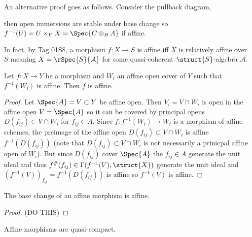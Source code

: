 \documentclass[12pt]{article}
\begin{document}
\begin{rmk}
An alternative proof goes as follows. Consider the pullback diagram,
\begin{center}
\end{center}
then open immersions are stable under base change so $f^{-1}(U) = U \times_Y X = \Spec{C \otimes_B A}$ if affine.
\end{rmk}

\begin{rmk}
In fact, by Tag 01S8, a morphism $f : X \to S$ is affine iff $X$ is relatively affine over $S$ meaning $X = \rSpec{S}{\mathcal{A}}$ for some quasi-coherent $\struct{S}$-algebra $\mathcal{A}$. 
\end{rmk}

\begin{lemma}
Let $f : X \to Y$ be a morphism and $W_i$ an affine open cover of $Y$ such that $f^{-1}(W_i)$ is affine. Then $f$ is affine.
\end{lemma}

\begin{proof}
Let $\Spec{A} = V \subset Y$ be affine open. Then $V_i = V \cap W_i$ is open in the affine open $V = \Spec{A}$ so it can be covered by principal opens $D(f_{ij}) \subset V \cap W_i$ for $f_{ij} \in A$. Since $f : f^{-1}(W_i) \to W_i$ is a morphism of affine schemes, the preimage of the affine open $D(f_{ij}) \subset V \cap W_i$ is affine $f^{-1}(D(f_{ij}))$ (note that $D(f_{ij}) \subset V \cap W_i$ is not necessarily a prinicpal affine open of $W_i$). But since $D(f_{ij})$ cover $\Spec{A}$ the $f_{ij} \in A$ generate the unit ideal and thus $f^\#(f_{ij}) \in \Gamma(f^{-1}(V), \struct{X})$ generate the unit ideal and $(f^{-1}(V))_{f_{ij}} = f^{-1}(D(f_{ij}))$ is affine so $f^{-1}(V)$ is affine.
\end{proof}

\begin{lemma}
The base change of an affine morphism is affine. 
\end{lemma}

\begin{proof}
(DO THIS)
\end{proof}


\begin{lemma}
Affine morphisms are quasi-compact.
\end{lemma}
\end{document}
